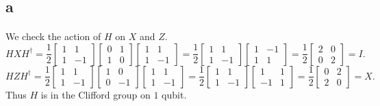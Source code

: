 \documentclass[letterpaper,12pt,oneside,onecolumn]{article}
\begin{document}
\section{}
\subsection{a}
\paragraph{}
We check the action of $H$ on $X$ and $Z$.
$$HXH^{\dagger} = \frac{1}{2} \begin{bmatrix} 1 & 1 \\ 1 &  -1 \end{bmatrix} \begin{bmatrix} 0 & 1 \\ 1 & 0 \end{bmatrix} \begin{bmatrix} 1 & 1 \\ 1 &  -1 \end{bmatrix} = \frac{1}{2} \begin{bmatrix} 1 & 1 \\ 1 &  -1 \end{bmatrix} \begin{bmatrix}1 & -1 \\ 1 & 1 \end{bmatrix} =\frac{1}{2} \begin{bmatrix} 2 & 0 \\ 0 & 2 \end{bmatrix} = I. $$
$$HZH^{\dagger} = \frac{1}{2} \begin{bmatrix} 1 & 1 \\ 1 &  -1 \end{bmatrix} \begin{bmatrix} 1 & 0 \\ 0 & -1 \end{bmatrix} \begin{bmatrix} 1 & 1 \\ 1 &  -1 \end{bmatrix} = \frac{1}{2} \begin{bmatrix} 1 & 1 \\ 1 &  -1 \end{bmatrix} \begin{bmatrix} 1 & 1 \\ -1 & 1\end{bmatrix} = \frac{1}{2} \begin{bmatrix} 0 & 2 \\ 2 & 0\end{bmatrix} = X.$$
Thus $H$ is in the Clifford group on $1$ qubit.
\end{document}

